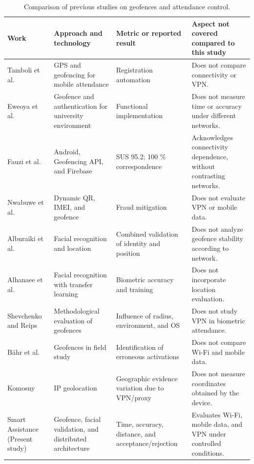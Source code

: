 \documentclass[runningheads]{llncs}
\begin{document}
\begin{table}[H]
\centering
\caption{Comparison of previous studies on geofences and attendance control.}
\label{tab:comparacion}
\renewcommand{\arraystretch}{0.95}
\footnotesize
\begin{tabularx}{\textwidth}{@{} >{\raggedright\arraybackslash}p{2.5cm} >{\raggedright\arraybackslash}X >{\raggedright\arraybackslash}X >{\raggedright\arraybackslash}X @{}}
\toprule
\textbf{Work} & \textbf{Approach and technology} & \textbf{Metric or reported result} & \textbf{Aspect not covered compared to this study} \\
\midrule
Tamboli et al. \cite{tamboli2024} & GPS and geofencing for mobile attendance & Registration automation & Does not compare connectivity or VPN. \\

Eweoya et al. \cite{eweoya2025} & Geofence and authentication for university environment & Functional implementation & Does not measure time or accuracy under different networks. \\

Fauzi et al. \cite{fauzi2025} & Android, Geofencing API, and Firebase & SUS 95.2; 100 \% correspondence & Acknowledges connectivity dependence, without contrasting networks. \\

Nwabuwe et al. \cite{nwabuwe2023} & Dynamic QR, IMEI, and geofence & Fraud mitigation & Does not evaluate VPN or mobile data. \\

Alburaiki et al. \cite{alburaiki2021} & Facial recognition and location & Combined validation of identity and position & Does not analyze geofence stability according to network. \\

Alhanaee et al. \cite{alhanaee2021} & Facial recognition with transfer learning & Biometric accuracy and training & Does not incorporate location evaluation. \\

Shevchenko and Reips \cite{shevchenko2024} & Methodological evaluation of geofences & Influence of radius, environment, and OS & Does not study VPN in biometric attendance. \\

Bähr et al. \cite{bahr2020} & Geofences in field study & Identification of erroneous activations & Does not compare Wi-Fi and mobile data. \\

Komosny \cite{komosny2023} & IP geolocation & Geographic evidence variation due to VPN/proxy & Does not measure coordinates obtained by the device. \\

Smart Assistance (Present study) & Geofence, facial validation, and distributed architecture & Time, accuracy, distance, and acceptance/rejection & Evaluates Wi-Fi, mobile data, and VPN under controlled conditions. \\
\bottomrule
\end{tabularx}
\end{table}
\end{document}

